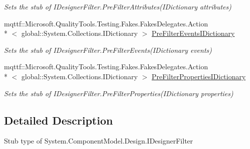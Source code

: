 \begin{DoxyCompactItemize}
\begin{DoxyCompactList}\small\item\em Sets the stub of I\-Designer\-Filter.\-Pre\-Filter\-Attributes(\-I\-Dictionary attributes)\end{DoxyCompactList}\item 
mqttf\-::\-Microsoft.\-Quality\-Tools.\-Testing.\-Fakes.\-Fakes\-Delegates.\-Action\\*
$<$ global\-::\-System.\-Collections.\-I\-Dictionary $>$ \hyperlink{class_system_1_1_component_model_1_1_design_1_1_fakes_1_1_stub_i_designer_filter_a3bbfd357d732c4d2582deb1264f0296c}{Pre\-Filter\-Events\-I\-Dictionary}
\begin{DoxyCompactList}\small\item\em Sets the stub of I\-Designer\-Filter.\-Pre\-Filter\-Events(\-I\-Dictionary events)\end{DoxyCompactList}\item 
mqttf\-::\-Microsoft.\-Quality\-Tools.\-Testing.\-Fakes.\-Fakes\-Delegates.\-Action\\*
$<$ global\-::\-System.\-Collections.\-I\-Dictionary $>$ \hyperlink{class_system_1_1_component_model_1_1_design_1_1_fakes_1_1_stub_i_designer_filter_abdcb720a38297badf3feb98cc0b958aa}{Pre\-Filter\-Properties\-I\-Dictionary}
\begin{DoxyCompactList}\small\item\em Sets the stub of I\-Designer\-Filter.\-Pre\-Filter\-Properties(\-I\-Dictionary properties)\end{DoxyCompactList}\end{DoxyCompactItemize}


\subsection{Detailed Description}
Stub type of System.\-Component\-Model.\-Design.\-I\-Designer\-Filter



